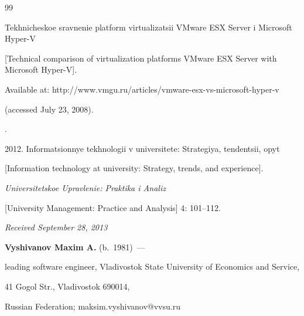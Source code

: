 {{\begin{thebibliography}{99}

Tekhnicheskoe sravnenie platform virtualizatsii VMware ESX Server i Microsoft Hyper-V 

[Technical comparison of virtualization platforms VMware ESX Server with Microsoft Hyper-V]. 

Available at: {\sf http://www.vmgu.ru/articles/vmware-esx-vs-microsoft-hyper-v} 

(accessed July 23, 2008).


. 

2012. Informatsionnye tekhnologii v universitete: Strategiya, tendentsii, opyt 

[Information technology at university: Strategy, trends, and experience]. 

\textit{Universitetskoe Upravlenie: Praktika i Analiz} 

[{University Management: Practice and Analysis}] 4: 101--112.





 \end{thebibliography}

} }






\hfill{\small\textit{Received September 28, 2013}}



\vspace*{-12pt}



\Contr

 



\noindent

\textbf{Vyshivanov Maxim A.} (b.\ 1981)~--- 

leading software engineer, Vladivostok State University of Economics and Service, 

41 Gogol Str., Vladivostok 690014,

Russian Federation;  maksim.vyshivanov@vvsu.ru










\noindent

